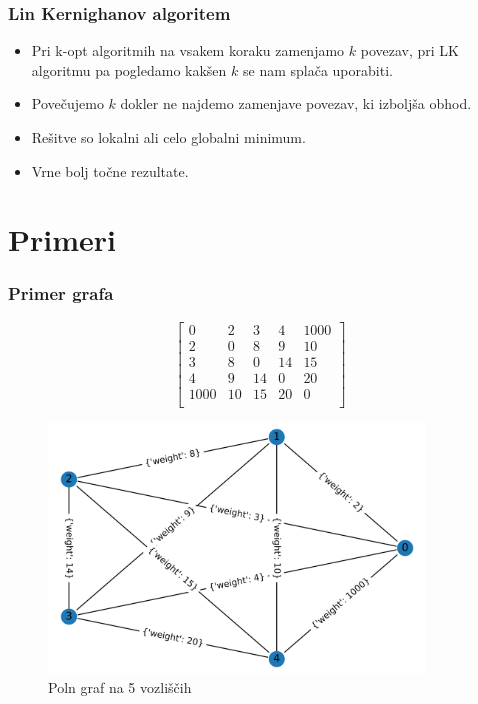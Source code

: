 \documentclass[8pt]{beamer}
\begin{document}
\begin{frame}
\frametitle{Lin Kernighanov algoritem}
\begin{itemize}
\item Pri k-opt algoritmih na vsakem koraku zamenjamo $k$ povezav, pri LK algoritmu pa pogledamo kakšen $k$  se nam splača uporabiti.
\item Povečujemo $k$ dokler ne najdemo zamenjave povezav, ki izboljša obhod.
\item Rešitve so lokalni ali celo globalni minimum.
\item Vrne bolj točne rezultate.
\end{itemize}
\end{frame}



\section[Primeri]{Primeri}
\begin{frame}
\frametitle{Primer grafa}
\begin{equation}
\label{matrika}
\begin{bmatrix} 
0&2&3&4&1000\\
2&0&8&9&10\\
3&8&0&14&15\\
4&9&14&0&20\\
1000&10&15&20&0\\
\end{bmatrix}
\end{equation}
\end{frame}

\begin{frame}
  \begin{figure}
  \includegraphics[width=10cm]{primeri/primer1.png}
 	\caption{Poln graf na 5 vozliščih}
	\label{Slika 1}
	\end{figure}
\end{frame}
\end{document}
